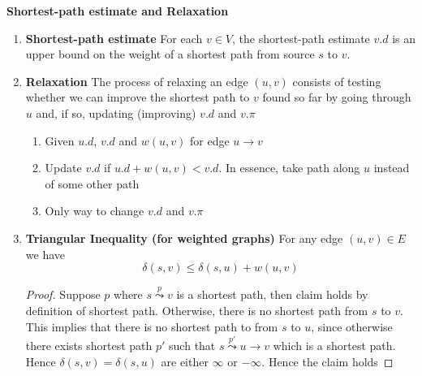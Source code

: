 \documentclass[11pt]{article}
\begin{document}
\begin{proposition*}
    \textbf{Shortest-path estimate and Relaxation}
    \begin{enumerate}
        \item \textbf{Shortest-path estimate} For each $v\in V$, the shortest-path estimate $v.d$ is an upper bound on the weight of a shortest path from source $s$ to $v$. 
        \item \textbf{Relaxation} The process of relaxing an edge $(u,v)$ consists of testing whether we can improve the shortest path to $v$ found so far by going through $u$ and, if so, updating (improving) $v.d$ and $v.\pi$
        \begin{enumerate}
            \item Given $u.d$, $v.d$ and $w(u,v)$ for edge $u \to v$ 
            \item Update $v.d$ if $u.d + w(u,v) < v.d$. In essence, take path along $u$ instead of some other path
            \item Only way to change $v.d$ and $v.\pi$
        \end{enumerate}
        \item \textbf{Triangular Inequality (for weighted graphs)} For any edge $(u,v) \in E$ we have 
        \[
            \delta(s,v) \leq \delta(s,u) + w(u,v)
        \]
        \begin{proof}
            Suppose $p$ where $s\overset{p}{\leadsto} v$ is a shortest path, then claim holds by definition of shortest path. Otherwise, there is no shortest path from $s$ to $v$. This implies that there is no shortest path to from $s$ to $u$, since otherwise there exists shortest path $p'$ such that  $s \overset{p'}{\leadsto} u \to v$ which is a shortest path. Hence $\delta(s,v) = \delta(s,u)$ are either $\infty$ or $-\infty$. Hence the claim holds 
        \end{proof}
    \end{enumerate}
\end{proposition*}
\end{document}
